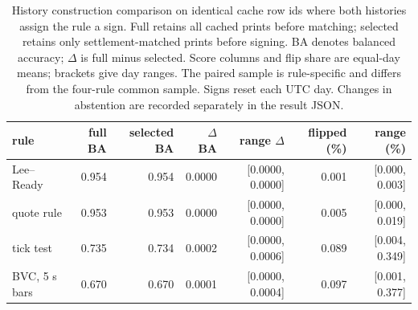 \begin{table}[htbp]
\centering\footnotesize\setlength{\tabcolsep}{3pt}
\begin{tabular}{lrrrrrr}
\toprule
rule & full BA & selected BA & $\Delta$ BA & range $\Delta$ & flipped (\%) & range (\%) \\
\midrule
Lee--Ready & 0.954 & 0.954 & 0.0000 & [0.0000, 0.0000] & 0.001 & [0.000, 0.003] \\
quote rule & 0.953 & 0.953 & 0.0000 & [0.0000, 0.0000] & 0.005 & [0.000, 0.019] \\
tick test & 0.735 & 0.734 & 0.0002 & [0.0000, 0.0006] & 0.089 & [0.004, 0.349] \\
BVC, 5 s bars & 0.670 & 0.670 & 0.0001 & [0.0000, 0.0004] & 0.097 & [0.001, 0.377] \\
\bottomrule
\end{tabular}
\caption{History construction comparison on identical cache row ids where both histories assign the rule a sign. Full retains all cached prints before matching; selected retains only settlement-matched prints before signing. BA denotes balanced accuracy; $\Delta$ is full minus selected. Score columns and flip share are equal-day means; brackets give day ranges. The paired sample is rule-specific and differs from the four-rule common sample. Signs reset each UTC day. Changes in abstention are recorded separately in the result JSON.}
\label{tab:cached-history}
\end{table}
